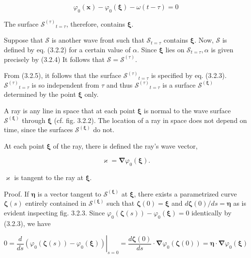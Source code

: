 \documentclass{article}
\begin{document}
\begin{equation*}
\varphi_{0}(\boldsymbol{x})-\varphi_{0}(\boldsymbol{\xi})-\omega(t-\tau)=0 \tag{3.2.5}
\end{equation*}
 

The surface $\mathcal{S}^{(\tau)}{ }_{t=\tau}$, therefore, contains $\boldsymbol{\xi}$.

Suppose that $\mathcal{S}$ is another wave front such that $\mathcal{S}_{t=\tau}$ contains $\boldsymbol{\xi}$. Now, $\mathcal{S}$ is defined by eq. (3.2.2) for a certain value of $\alpha$. Since $\boldsymbol{\xi}$ lies on $\mathcal{S}_{t=\tau}, \alpha$ is given precisely by (3.2.4) It follows that $\mathcal{S}=\mathcal{S}^{(\tau)}$.

From (3.2.5), it follows that the surface $\mathcal{S}^{(\tau)}{ }_{t=\tau}$ is specified by eq. (3.2.3). $\mathcal{S}^{(\tau)}{ }_{t=\tau}$ is so independent from $\tau$ and thus $\mathcal{S}^{(\tau)}{ }_{t=\tau}$ is a surface $\mathcal{S}^{(\boldsymbol{\xi})}$ determined by the point $\boldsymbol{\xi}$ only.

A ray is any line in space that at each point $\boldsymbol{\xi}$ is normal to the wave surface $\mathcal{S}^{(\boldsymbol{\xi})}$ through $\boldsymbol{\xi}$ (cf. fig. 3.2.2). The location of a ray in space does not depend on time, since the surfaces $\mathcal{S}^{(\boldsymbol{\xi})}$ do not.

At each point $\boldsymbol{\xi}$ of the ray, there is defined the ray's wave vector,
 
\begin{equation*}
\varkappa=\boldsymbol{\nabla} \varphi_{0}(\boldsymbol{\xi}) . \tag{3.2.6}
\end{equation*}
 
$\boldsymbol{\varkappa}$ is tangent to the ray at $\boldsymbol{\xi}$.

Proof. If $\boldsymbol{\eta}$ is a vector tangent to $\mathcal{S}^{(\boldsymbol{\xi})}$ at $\boldsymbol{\xi}$, there exists a parametrized curve $\boldsymbol{\zeta}(s)$ entirely contained in $\mathcal{S}^{(\boldsymbol{\xi})}$ such that $\boldsymbol{\zeta}(0)=\boldsymbol{\xi}$ and $d \boldsymbol{\zeta}(0) / d s=\boldsymbol{\eta}$ as is evident inspecting fig. 3.2.3. Since $\varphi_{0}(\boldsymbol{\zeta}(s))-\varphi_{0}(\boldsymbol{\xi})=0$ identically by (3.2.3), we have
 
\begin{equation*}
0=\left.\frac{d}{d s}\left(\varphi_{0}(\boldsymbol{\zeta}(s))-\varphi_{0}(\boldsymbol{\xi})\right)\right|_{s=0}=\frac{d \boldsymbol{\zeta}(0)}{d s} \cdot \boldsymbol{\nabla} \varphi_{0}(\boldsymbol{\zeta}(0))=\boldsymbol{\eta} \cdot \boldsymbol{\nabla} \varphi_{0}(\boldsymbol{\xi}) \tag{3.2.7}
\end{equation*}
 
\end{document}
